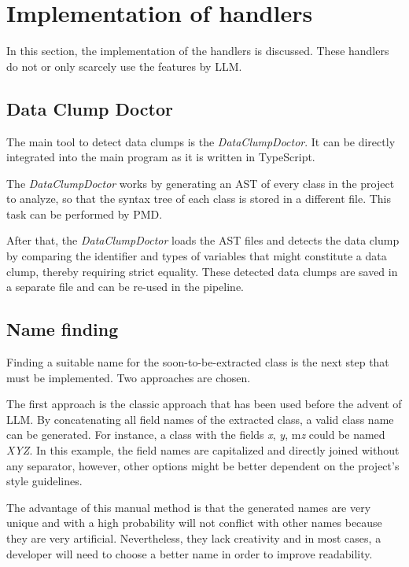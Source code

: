 \section{Implementation of handlers} \label{sec:step_impl}
In this section, the implementation of the handlers is discussed. These handlers do not or only scarcely use the features by \ac{LLM}. 
\subsection{Data Clump Doctor}

The main tool to detect  data clumps is the \textit{DataClumpDoctor}. It can be directly integrated into the main program as it is written in TypeScript.

The \textit{DataClumpDoctor} works by generating an \ac{AST} of every class in the project to analyze, so that the syntax tree of each class is stored in a different file.  This task can be performed by PMD.

After that, the \textit{DataClumpDoctor} loads the \ac{AST} files and detects the data clump by comparing the identifier and types of variables that might constitute a data clump, thereby requiring strict equality. These detected data clumps are saved in a separate file and can be re-used in the pipeline. 


\subsection{Name finding}
Finding a suitable name for the soon-to-be-extracted class is the next step  that must be implemented. Two approaches are chosen.

The first approach is the classic approach that has been used before the advent of \acs{LLM}. By concatenating all field names of the extracted class, a valid class name can be generated. For instance, a class with the fields \textit{x}, \textit{y}, m\textit{z} could be named \textit{XYZ}. In this example, the field names are capitalized and directly joined without any separator, however, other options might be better dependent on the project's style guidelines. 

The advantage of this manual method is that the generated names are very unique and with a high probability will not conflict with other names because they are very artificial. Nevertheless, they lack creativity and in most cases, a developer will need to choose a better name in order to improve readability. 


